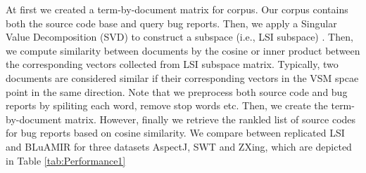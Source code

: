 \documentclass[conference]{IEEEtran}
\begin{document}
At first we created a term-by-document matrix for corpus. Our corpus contains both the source code base and query bug reports. Then, we apply a Singular Value Decomposition (SVD) to construct a subspace (i.e., LSI subspace) \cite{SaltonMIR}. 
Then, we compute similarity between documents by the cosine or inner product between the corresponding vectors collected from LSI subspace matrix. Typically, two documents are considered similar if their corresponding vectors in the VSM spcae point in the same direction.
Note that we preprocess both source code and bug reports by spiliting each word, remove stop words etc. Then, we create the term-by-document matrix. However, finally we retrieve the rankled list of source codes for bug reports based on cosine similarity. We compare between replicated LSI and BLuAMIR for three datasets AspectJ, SWT and ZXing, which are depicted in Table \ref{tab:Performance1} 
\end{document}
